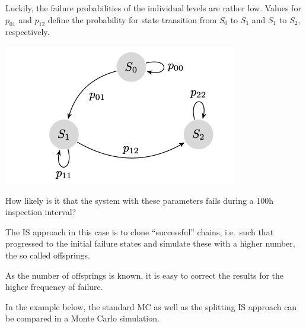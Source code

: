 \documentclass[11pt,a4paper, d]{scrartcl}
\begin{document}
Luckily, the failure probabilities of the individual levels are rather
low. Values for \(p_{01}\) and \(p_{12}\) define the probability for
state transition from \(S_0\) to \(S_1\) and \(S_1\) to \(S_2\),
respectively.

\includegraphics{MarkovChain.png}

How likely is it that the system with these parameters fails during a
100h inspection interval?

The IS approach in this case is to clone ``successful'' chains,
i.e.~such that progressed to the initial failure states and simulate
these with a higher number, the so called offsprings.

As the number of offsprings is known, it is easy to correct the results
for the higher frequency of failure.

In the example below, the standard MC as well as the splitting IS
approach can be compared in a Monte Carlo simulation.
\end{document}
